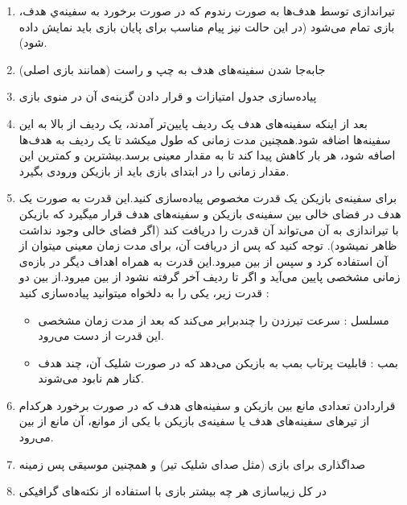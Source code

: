 \documentclass[]{article}
\begin{document}
\begin{enumerate}
\item تیراندازی توسط هدف‌ها به صورت رندوم که در صورت برخورد به سفینه‌ي هدف، بازی تمام می‌شود (در این حالت نیز پیام مناسب برای پایان بازی باید نمایش داده شود).
\item جابه‌جا شدن سفینه‌های هدف به چپ و راست (همانند بازی اصلی)
\item پیاده‌سازی جدول امتیازات و قرار دادن گزینه‌ی آن در منوی بازی
\item بعد از اینکه سفینه‌های هدف یک ردیف پایین‌تر آمدند، یک ردیف از بالا به این سفینه‌ها اضافه شود.همچنین مدت زمانی که طول میکشد تا یک ردیف به هدف‌ها اصافه شود، هر بار کاهش پیدا کند تا به مقدار معینی برسد.بیشترین و کمترین این مقدار زمانی را در ابتدای بازی باید از بازیکن ورودی بگیرد.
\item برای سفینه‌ی بازیکن یک قدرت مخصوص پیاده‌سازی کنید.این قدرت به صورت یک هدف در فضای خالی بین سفینه‌ی بازیکن و سفینه‌های هدف قرار میگیرد که بازیکن با تیراندازی به آن می‌تواند آن قدرت را دریافت کند (اگر فضای خالی وجود نداشت ظاهر نمیشود). توجه کنید که پس از دریافت آن، برای مدت زمان معینی میتوان از آن استفاده کرد و سپس از بین میرود.این قدرت به همراه اهداف دیگر در بازه‌ی زمانی مشخصی پایین می‌آید و اگر تا ردیف آخر گرفته نشود از بین میرود.از بین دو قدرت زیر، یکی را به دلخواه میتوانید پیاده‌سازی کنید :
\begin{itemize}[label = $\circ$]
\item مسلسل : سرعت تیر‌زدن را چند‌برابر می‌کند که بعد از مدت زمان مشخصی این قدرت از دست می‌رود.
\item بمب : قابلیت پرتاب بمب به بازیکن می‌دهد که در صورت شلیک آن، چند هدف کنار هم نابود می‌شوند.
\end{itemize}
\item قراردادن تعدادی مانع بین بازیکن و سفینه‌های هدف که در صورت برخورد هرکدام از تیرهای سفینه‌های هدف یا سفینه‌ی بازیکن با یکی از موانع، آن مانع از بین می‌رود.
\item صداگذاری برای بازی (مثل صدای شلیک تیر) و همچنین موسیقی پس زمینه
\item در کل زیباسازی هر چه بیشتر بازی با استفاده از نکته‌های گرافیکی
\end{enumerate}


\newpage
\end{document}
